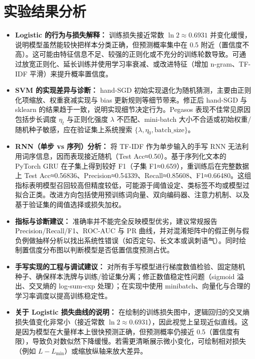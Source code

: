 \section{实验结果分析}

\begin{itemize}
    \item {\bf Logistic 的行为与损失解释：} 训练损失接近常数 $\ln 2\approx0.6931$ 并变化缓慢，说明模型虽然能较快把样本分类正确，但预测概率集中在 0.5 附近（置信度不高）。这可能由特征信息不足、较强的正则化或不充分的训练轮数导致。可通过放宽正则化、延长训练并使用学习率衰减、或改进特征（增加 n-gram、TF-IDF 平滑）来提升概率置信度。

    \item {\bf SVM 的实现差异与诊断：} hand-SGD 初始实现退化为随机猜测，主要由正则化项缩放、权重衰减实现与 bias 更新规则等细节带来。修正后 hand-SGD 与 sklearn 的结果趋于一致，说明实现细节决定行为。Pegasos 表现不佳常见原因包括步长调度 $\eta_t$ 与正则化强度 $\lambda$ 不匹配、mini-batch 大小不合适或初始权重/随机种子敏感，应在验证集上系统搜索 $\{\lambda,\eta_0,\text{batch\_size}\}$。

    \item {\bf RNN（单步 vs 序列）分析：} 将 TF-IDF 作为单步输入的手写 RNN 无法利用词序信息，因而表现接近随机（Test Acc≈0.50）。基于序列化文本的 PyTorch GRU 在子集上得到较好 F1（子集 F1≈0.659），重训练后在完整数据上 Test Acc≈0.56836、Precision≈0.54339、Recall≈0.85608、F1≈0.66480。这组指标表明模型召回较高但精度较低，可能源于阈值设定、类标签不均或模型过拟合正类。改进方向包括使用预训练词向量、双向编码器、注意力机制、以及基于验证集的阈值选择或损失加权。

    \item {\bf 指标与诊断建议：} 准确率并不能完全反映模型优劣，建议常规报告 Precision/Recall/F1、ROC-AUC 与 PR 曲线，并对混淆矩阵中的假正例与假负例做抽样分析以找出系统性错误（如否定句、长文本或讽刺语气）。同时绘制置信度分布图以判断模型是否低置信度预测占优。

    \item {\bf 手写实现的工程与调试建议：} 对所有手写模型进行梯度数值检验、固定随机种子、确保样本洗牌与训练/验证集分离；修正数值稳定性问题（sigmoid 溢出、交叉熵的 log-sum-exp 处理）；在实现中使用 minibatch、向量化与合理的学习率调度以提高训练稳定性。

    \item {\bf 关于 Logistic 损失曲线的说明：} 在绘制的训练损失图中，逻辑回归的交叉熵损失值变化非常小（接近常数 $\ln 2\approx0.6931$），因此视觉上呈现近似直线。这是因为模型在大量样本上很快预测正确，但预测概率仍接近 0.5（置信度有限），导致负对数似然下降缓慢。若需更清晰展示微小变化，可绘制相对损失（例如 $L-L_{\min}$）或缩放纵轴来放大差异。


\end{itemize}
